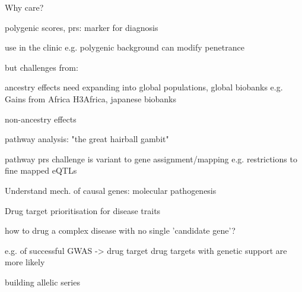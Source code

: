 \begin{outline}

\1 Why care?

    \2 polygenic scores, prs: marker for diagnosis

        \3 use in the clinic
            \4 e.g. polygenic background can modify penetrance 

        \3 but challenges from:

            \4 ancestry effects
            \4 need expanding into global populations, global biobanks e.g. Gains from Africa H3Africa, japanese biobanks

            \4 non-ancestry effects

    \2 pathway analysis: "the great hairball gambit"

    \2 pathway prs
        \3 challenge is variant to gene assignment/mapping
            \4 e.g. restrictions to fine mapped eQTLs

    \2 Understand mech. of causal genes: molecular pathogenesis

    \2 Drug target prioritisation for disease traits

    \2 how to drug a complex disease with no single 'candidate gene'?

        \3 e.g. of successful GWAS -> drug target
            \4 drug targets with genetic support are more likely

        \3 building allelic series


\end{outline}

